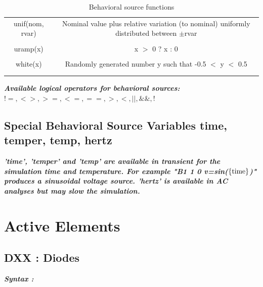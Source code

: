 \begin{longtable}{c c}
unif(nom, rvar) & \begin{minipage}{20em}
Nominal value plus relative variation (to nominal) uniformly distributed between $\pm$rvar
\end{minipage}\\ \\

uramp(x) & \begin{minipage}{20em}
x $>$ 0 ? x : 0
\end{minipage}\\ \\

white(x) & \begin{minipage}{20em}
Randomly generated number y such that -0.5 $<$ y $<$ 0.5
\end{minipage}\\ \\[1ex] %
\hline %

\caption{Behavioral source functions}
\label {tab:paramfuncs}
\end{longtable}

\textbf{\textit{Available logical operators for behavioral sources: $!=, <>, >=, <=, ==, >, <, ||, \&\&, !$ }}

\subsection{Special Behavioral Source Variables time, temper, temp, hertz}
\textbf{\textit{'time', 'temper' and 'temp' are available in transient for the simulation time and temperature. For example "B1 1 0 v=sin($\rm{\left\{time\right\}}$)" produces a sinusoidal voltage source. 'hertz' is available in AC analyses but may slow the simulation.}}

\newpage
\section{Active Elements}
\label{sec_sceadm_activeelements}

\subsection{DXX : Diodes}
\label{subsec_sceadm_diodes}

\textbf{\textit{Syntax :}}


